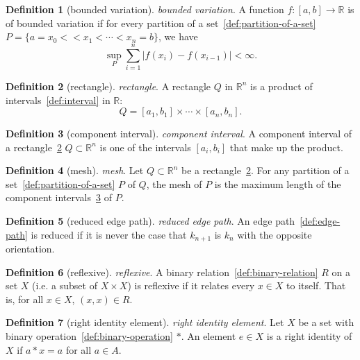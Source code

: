 \documentclass[12pt,a4paper]{article}
\theoremstyle{definition}
\newtheorem{definition}{Definition}
\begin{document}
\begin{definition}[bounded variation]\label{def:bounded-variation}
\emph{bounded variation}. A function $f: [a,b]\to \mathbb R$ is of bounded variation if for every partition of a set~\ref{def:partition-of-a-set} $P =\{a= x_0 < <x_1 < \cdots < x_n = b\}$, we have $$\sup_P \sum_{i=1}^n \vert f(x_i)-f(x_{i-1})\vert  <\infty.$$
\end{definition}

\begin{definition}[rectangle]\label{def:rectangle}
\emph{rectangle}. A rectangle $Q$ in $\mathbb R^n$ is a product of intervals~\ref{def:interval} in $\mathbb R$: $$Q = [a_1,b_1]\times \cdots\times [a_n,b_n].$$
\end{definition}

\begin{definition}[component interval]\label{def:component-interval}
\emph{component interval}. A component interval of a rectangle~\ref{def:rectangle} $Q \subset \mathbb R^n$ is one of the intervals $[a_i,b_i]$ that make up the product.
\end{definition}

\begin{definition}[mesh]\label{def:mesh}
\emph{mesh}. Let $Q\subset\mathbb R^n$ be a rectangle~\ref{def:rectangle}. For any partition of a set~\ref{def:partition-of-a-set} $P$ of $Q$, the mesh of $P$ is the maximum length of the component intervals~\ref{def:component-interval} of $P$.
\end{definition}

\begin{definition}[reduced edge path]\label{def:reduced-edge-path}
\emph{reduced edge path}. An edge path~\ref{def:edge-path} is reduced if it is never the case that $k_{n+1}$ is $k_n$ with the opposite orientation.
\end{definition}

\begin{definition}[reflexive]\label{def:reflexive}
\emph{reflexive}. A binary relation~\ref{def:binary-relation} $R$ on a set $X$ (i.e. a subset of $X \times X$) is reflexive if it relates every $x \in X$ to itself. That is, for all $x \in X$, $(x,x) \in R$.
\end{definition}

\begin{definition}[right identity element]\label{def:right-identity-element}
\emph{right identity element}. Let $X$ be a set with binary operation~\ref{def:binary-operation} $*$. An element $e\in X$ is a right identity of $X$ if $a*x = a$ for all $a\in A$.
\end{definition}
\end{document}
